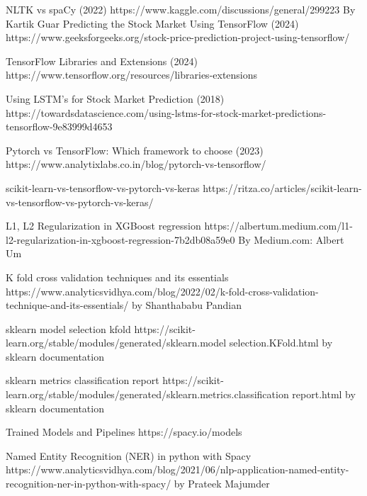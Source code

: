 \documentclass[11pt, a4paper]{article}
\begin{document}
\begin{thebibliography}{9}
NLTK vs spaCy  (2022)
https://www.kaggle.com/discussions/general/299223
By Kartik Guar
Predicting the Stock Market Using TensorFlow (2024)
https://www.geeksforgeeks.org/stock-price-prediction-project-using-tensorflow/

TensorFlow Libraries and Extensions (2024)
https://www.tensorflow.org/resources/libraries-extensions

Using LSTM's for Stock Market Prediction (2018)
https://towardsdatascience.com/using-lstms-for-stock-market-predictions-tensorflow-9e83999d4653

Pytorch vs TensorFlow: Which framework to choose (2023)
https://www.analytixlabs.co.in/blog/pytorch-vs-tensorflow/

scikit-learn-vs-tensorflow-vs-pytorch-vs-keras
https://ritza.co/articles/scikit-learn-vs-tensorflow-vs-pytorch-vs-keras/

L1, L2 Regularization in XGBoost regression
https://albertum.medium.com/l1-l2-regularization-in-xgboost-regression-7b2db08a59e0
By Medium.com: Albert Um

K fold cross validation techniques and its essentials
https://www.analyticsvidhya.com/blog/2022/02/k-fold-cross-validation-technique-and-its-essentials/
by Shanthababu Pandian

sklearn model selection kfold
https://scikit-learn.org/stable/modules/generated/sklearn.model selection.KFold.html
by sklearn documentation

sklearn metrics classification report
https://scikit-learn.org/stable/modules/generated/sklearn.metrics.classification report.html
by sklearn documentation

Trained Models and Pipelines 
https://spacy.io/models

Named Entity Recognition (NER) in python with Spacy
https://www.analyticsvidhya.com/blog/2021/06/nlp-application-named-entity-recognition-ner-in-python-with-spacy/
by Prateek Majumder

\end{thebibliography}
\end{document}
